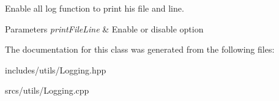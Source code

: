 Enable all log function to print his file and line. 


\begin{DoxyParams}{Parameters}
{\em print\+File\+Line} & Enable or disable option \\
\hline
\end{DoxyParams}


The documentation for this class was generated from the following files\+:\begin{DoxyCompactItemize}
\item 
includes/utils/Logging.\+hpp\item 
srcs/utils/Logging.\+cpp\end{DoxyCompactItemize}
